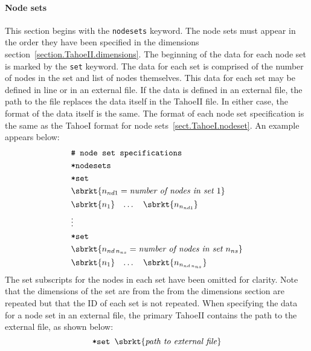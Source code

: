 \paragraph{Node sets}
This section begins with the \texttt{nodesets} keyword.
The node sets must appear in the order they have been specified in 
the dimensions section~\ref{section.TahoeII.dimensions}. The 
beginning of the data for each node set is marked by the \texttt{set} 
keyword. The data for each set is comprised of the number of nodes in 
the set and list of nodes themselves. This data for each set may be 
defined in line or in an external file. If the data is defined in an 
external file, the path to the file replaces the data itself in the 
TahoeII file. In either case, the format of the data itself is the 
same. The format of each node set specification is the same as the TahoeI 
format for node sets~\ref{sect.TahoeI.nodeset}. An example appears 
below:
\begin{align}
& \texttt{\# node set specifications} \notag \\
& \texttt{*nodesets} \notag \\
& \texttt{*set} \notag \\
& \sbrkt{n_{nd1} = \textit{number of nodes in set~}1} \notag \\
& \begin{matrix}
\sbrkt{n_{1}} & \dots  & \sbrkt{n_{n_{nd1}}} \\
\end{matrix} \notag \\
& \vdots \notag \\
& \texttt{*set} \notag \\
& \sbrkt{n_{nd\,n_{ns}} = \textit{number of nodes in set~}n_{ns}} \notag \\
& \begin{matrix}
\sbrkt{n_{1}} & \dots  & \sbrkt{n_{n_{nd\,n_{ns}}}} \\
\end{matrix} \notag
\end{align}
The set subscripts for the nodes in each set have been omitted for 
clarity.
Note that the dimensions of the set are from the from the dimensions 
section are repeated but that the ID of each set is not repeated.
When specifying the data for a node set in an external file, the 
primary TahoeII contains the path to the external file, as shown below:
\[
\texttt{*set~} \sbrkt{\textrm{\textit{path to external file}}}
\]

